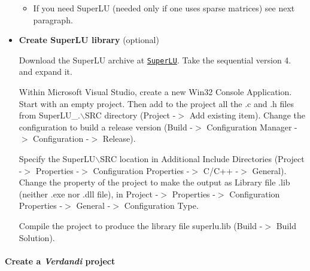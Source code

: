 \documentclass{tufte-book}
\begin{document}
\begin{itemize}
\begin{itemize}
\end{itemize}




\begin{itemize}
\item \-If you need \-Super\-L\-U (needed only if one uses sparse matrices) see next paragraph.
\end{itemize}

\item {\bfseries \-Create SuperLU library} (optional)\par

Download the \-Super\-L\-U archive at \href{http://crd.lbl.gov/~xiaoye/SuperLU/}{\tt \-Super\-L\-U}. \-Take the sequential version 4. and expand it. \par


\-Within \-Microsoft \-Visual \-Studio, create a new \-Win32 \-Console \-Application. \-Start with an empty project. \-Then add to the project all the {\ttfamily .c} and {\ttfamily .h} files from {\ttfamily \-Super\-L\-U\-\_.$\backslash$\-S\-R\-C} directory (\-Project -\/$>$ \-Add existing item). \-Change the configuration to build a release version (\-Build -\/$>$ \-Configuration \-Manager -\/$>$ \-Configuration -\/$>$ \-Release). \par


\-Specify the {\ttfamily \-Super\-L\-U$\backslash$\-S\-R\-C} location in {\ttfamily \-Additional \-Include \-Directories} (\-Project -\/$>$ \-Properties -\/$>$ \-Configuration \-Properties -\/$>$ \-C/\-C++ -\/$>$ \-General). \-Change the property of the project to make the output as \-Library file {\ttfamily .lib} (neither {\ttfamily .exe} nor {\ttfamily .dll} file), in \-Project -\/$>$ \-Properties -\/$>$ \-Configuration \-Properties -\/$>$ \-General -\/$>$ \-Configuration \-Type. \par


\-Compile the project to produce the library file {\ttfamily superlu.\-lib} (\-Build -\/$>$ \-Build \-Solution).


\end{itemize}\hypertarget{installation_project}{}\paragraph{\-Create a \emph{Verdandi} project}\label{installation_project}
\end{document}
